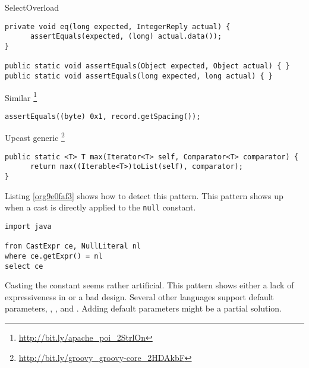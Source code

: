 \begin{pattern}{SelectOverload}
\begin{verbatim}
private void eq(long expected, IntegerReply actual) {
      assertEquals(expected, (long) actual.data());
}

public static void assertEquals(Object expected, Object actual) { }
public static void assertEquals(long expected, long actual) { }
\end{verbatim}

Similar%
\footnote{\url{http://bit.ly/apache_poi_2StrlOn}}

\begin{verbatim}
assertEquals((byte) 0x1, record.getSpacing());
\end{verbatim}

Upcast generic%
\footnote{\url{http://bit.ly/groovy_groovy-core_2HDAkbF}}

\begin{verbatim}
public static <T> T max(Iterator<T> self, Comparator<T> comparator) {
      return max((Iterable<T>)toList(self), comparator);
}
\end{verbatim}

\detection{}
Listing \ref{org9e0faf3} shows how to detect this pattern.
This pattern shows up when a cast is directly applied to the \texttt{null} constant.

\begin{lstlisting}
import java

from CastExpr ce, NullLiteral nl
where ce.getExpr() = nl
select ce
\end{lstlisting}

\discussion{}
Casting the  constant seems rather artificial.
This pattern shows either a lack of expressiveness in \java{} or
a bad \api{} design.
Several other languages support default parameters, \eg{},
\scala{}, \csharp{} and \cpp{}.
Adding default parameters might be a partial solution.
\end{pattern}